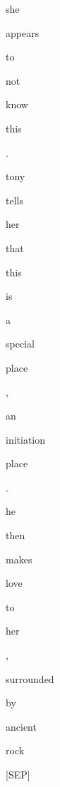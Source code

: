 \documentclass[varwidth=150mm]{standalone}
\begin{document}
\begin{CJK*}{UTF8}{gbsn}
{{{\colorbox{red!2.8477394580841064}{\strut she} \colorbox{red!7.060179710388184}{\strut appears} \colorbox{red!3.448246479034424}{\strut to} \colorbox{red!4.8943891525268555}{\strut not} \colorbox{red!0.0}{\strut know} \colorbox{red!1.6496278047561646}{\strut this} \colorbox{red!0.0}{\strut .} \colorbox{red!100.00000762939453}{\strut tony} \colorbox{red!21.936153411865234}{\strut tells} \colorbox{red!2.6878771781921387}{\strut her} \colorbox{red!23.828771591186523}{\strut that} \colorbox{red!3.3208119869232178}{\strut this} \colorbox{red!0.0}{\strut is} \colorbox{red!0.0}{\strut a} \colorbox{red!2.158010482788086}{\strut special} \colorbox{red!2.108569383621216}{\strut place} \colorbox{red!5.294875144958496}{\strut ,} \colorbox{red!0.0}{\strut an} \colorbox{red!4.707197666168213}{\strut initiation} \colorbox{red!1.493451714515686}{\strut place} \colorbox{red!0.0}{\strut .} \colorbox{red!2.4414350986480713}{\strut he} \colorbox{red!3.0324900150299072}{\strut then} \colorbox{red!0.0}{\strut makes} \colorbox{red!8.907526016235352}{\strut love} \colorbox{red!0.0}{\strut to} \colorbox{red!0.0}{\strut her} \colorbox{red!10.288576126098633}{\strut ,} \colorbox{red!1.3063843250274658}{\strut surrounded} \colorbox{red!0.0}{\strut by} \colorbox{red!5.849261283874512}{\strut ancient} \colorbox{red!25.600740432739258}{\strut rock} \colorbox{red!1.639909029006958}{\strut [SEP]}
}}}
\end{CJK*}
\end{document}
